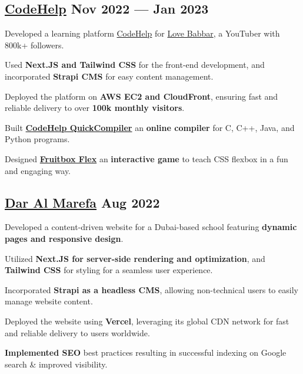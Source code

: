 \subsection{{\href{https://www.thecodehelp.in/}{CodeHelp} \hfill Nov 2022 --- Jan 2023}}
\begin{zitemize}
\item Developed a learning platform \href{https://www.thecodehelp.in/}{CodeHelp} for \href{https://www.youtube.com/@LoveBabbar}{Love Babbar}, a YouTuber with 800k+ followers.
\item Used \textbf{Next.JS and Tailwind CSS} for the front-end development, and incorporated \textbf{Strapi CMS} for easy content management.
\item Deployed the platform on \textbf{AWS EC2 and CloudFront}, ensuring fast and reliable delivery to over \textbf{100k monthly visitors}.
\item Built \href{https://codehelp-labs.vercel.app/quick-compiler}{\textbf{CodeHelp QuickCompiler}} an \textbf{online compiler} for C, C++, Java, and Python programs.
\item Designed \href{https://games.thecodehelp.in/}{\textbf{Fruitbox Flex}} an  \textbf{interactive game} to teach CSS flexbox in a fun and engaging way.
\end{zitemize}

\subsection{{\href{https://www.daralmarefa.ae/}{Dar Al Marefa} \hfill Aug 2022}}
\begin{zitemize}
\item Developed a content-driven website for a Dubai-based school featuring \textbf{dynamic pages and responsive design}.
\item Utilized \textbf{Next.JS for server-side rendering and optimization}, and \textbf{Tailwind CSS} for styling for a seamless user experience.
\item Incorporated \textbf{Strapi as a headless CMS}, allowing non-technical users to easily manage website content.
\item Deployed the website using \textbf{Vercel}, leveraging its global CDN network for fast and reliable delivery to users worldwide. 
\item \textbf{Implemented SEO} best practices resulting in successful indexing on Google search \& improved visibility.
\end{zitemize}

